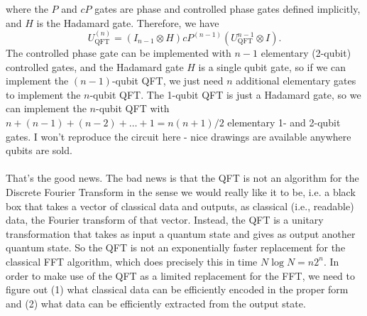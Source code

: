\documentclass[]{article}
\begin{document}
where the $P$ and $cP$ gates are phase and controlled phase gates defined implicitly, and $H$ is the Hadamard gate. Therefore, we have
\begin{equation}
U_\text{QFT}^{(n)}=\left(I_{n-1}\otimes H\right)cP^{(n-1)}\left(U_\text{QFT}^{n-1}\otimes I\right).
\end{equation}
The controlled phase gate can be implemented with $n-1$ elementary (2-qubit)  controlled gates, and the Hadamard gate $H$ is a single qubit gate, so if we can implement the $(n-1)$-qubit QFT, we just need $n$ additional elementary gates to implement the $n$-qubit QFT. The 1-qubit QFT is just a Hadamard gate, so we can implement the $n$-qubit QFT with $n+(n-1)+(n-2)+\ldots +1=n(n+1)/2$ elementary 1- and 2-qubit gates. I won't reproduce the circuit here - nice drawings are available anywhere qubits are sold.\\
\\
That's the good news. The bad news is that the QFT is not an algorithm for the Discrete Fourier Transform in the sense we would really like it to be, i.e. a black box that takes a vector of classical data and outputs, as classical (i.e., readable) data, the Fourier transform of that vector. Instead, the QFT is a unitary transformation that takes as input a quantum state and gives as output another quantum state. So the QFT is not an exponentially faster replacement for the classical FFT algorithm, which does precisely this in time $N\log N=n 2^n$. In order to make use of the QFT as a limited replacement for the FFT, we need to figure out (1) what classical data can be efficiently encoded in the proper form and (2) what data can be efficiently extracted from the output state.
\end{document}
